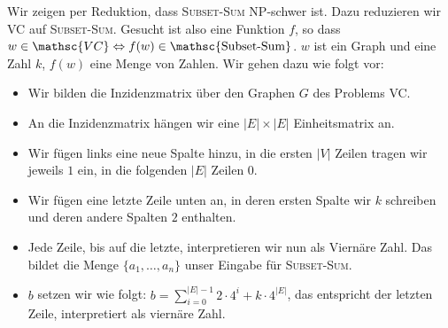 Wir zeigen per Reduktion, dass \textsc{Subset-Sum} \textsf{NP}-schwer ist. Dazu reduzieren wir \textsc{VC} auf \textsc{Subset-Sum}. Gesucht ist also eine Funktion $f$, so dass $w \in \mathsc{VC} \Leftrightarrow f(w) \in \operatorname{\mathsc{Subset-Sum}}$. $w$ ist ein Graph und eine Zahl $k$, $f(w)$ eine Menge von Zahlen. Wir gehen dazu wie folgt vor:
\begin{itemize}
  \item Wir bilden die Inzidenzmatrix über den Graphen $G$ des Problems \textsc{VC}.
  \item An die Inzidenzmatrix hängen wir eine $|E| \times |E|$ Einheitsmatrix an.
  \item Wir fügen links eine neue Spalte hinzu, in die ersten $|V|$ Zeilen tragen wir jeweils $1$ ein, in die folgenden $|E|$ Zeilen $0$.
  \item Wir fügen eine letzte Zeile unten an, in deren ersten Spalte wir $k$ schreiben und deren andere Spalten $2$ enthalten.
  \item Jede Zeile, bis auf die letzte, interpretieren wir nun als Viernäre Zahl. Das bildet die Menge $\{a_1, \ldots, a_n\}$ unser Eingabe für \textsc{Subset-Sum}.
  \item $b$ setzen wir wie folgt: $b = \sum_{i=0}^{|E|-1}2 \cdot 4^i + k\cdot 4^{|E|}$, das entspricht der letzten Zeile, interpretiert als viernäre Zahl.
\end{itemize}

